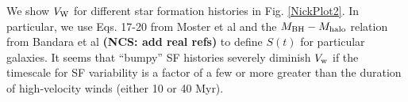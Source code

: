 We show $V_{\rm W}$ for different star formation histories in
Fig. \ref{NickPlot2}.  In particular, we use Eqs. 17-20 from Moster et
al and the $M_{\rm BH}-M_{\rm halo}$ relation from Bandara et al {\bf
(NCS: add real refs)} to define $S(t)$ for particular galaxies.  It
seems that ``bumpy'' SF histories severely diminish $V_{\rm w}$ if the
timescale for SF variability is a factor of a few or more greater than
the duration of high-velocity winds (either 10 or 40 Myr).

